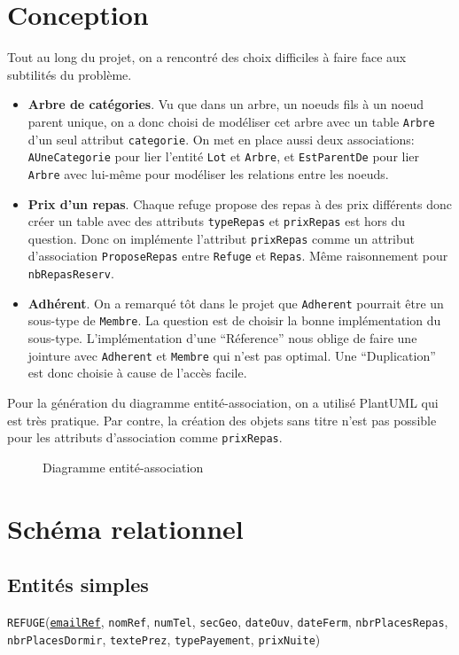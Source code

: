 \documentclass[12pt, a4paper]{article}
\newcommand\att[1]{\textnhtt{#1}}
\begin{document}
\section{Conception}
Tout au long du projet, on a rencontré des choix difficiles à faire face aux subtilités du problème.

\begin{itemize}
\item \textbf{Arbre de catégories}.
  Vu que dans un arbre, un noeuds fils à un noeud parent unique, on a donc choisi de modéliser cet arbre avec un table \att{Arbre} d'un seul attribut \att{categorie}.
  On met en place aussi deux associations: \att{AUneCategorie} pour lier l'entité \att{Lot} et \att{Arbre}, et \att{EstParentDe} pour lier \att{Arbre} avec lui-même pour modéliser les relations entre les noeuds.
\item \textbf{Prix d'un repas}.
  Chaque refuge propose des repas à des prix différents donc créer un table avec des attributs \att{typeRepas} et \att{prixRepas} est hors du question.
  Donc on implémente l'attribut \att{prixRepas} comme un attribut d'association \att{ProposeRepas} entre \att{Refuge} et \att{Repas}.
  Même raisonnement pour \att{nbRepasReserv}.
\item \textbf{Adhérent}.
  On a remarqué tôt dans le projet que \att{Adherent} pourrait être un sous-type de \att{Membre}.
  La question est de choisir la bonne implémentation du sous-type.
  L'implémentation d'une \enquote{Réference} nous oblige de faire une jointure avec \att{Adherent} et \att{Membre} qui n'est pas optimal.
  Une \enquote{Duplication} est donc choisie à cause de l'accès facile.
\end{itemize}

Pour la génération du diagramme entité-association, on a utilisé PlantUML qui est très pratique.
Par contre, la création des objets sans titre n'est pas possible pour les attributs d'association comme \att{prixRepas}.

\begin{figure}[h!]

\caption{Diagramme entité-association}
\end{figure}

\section{Schéma relationnel}
\subsection*{Entités simples}
\att{REFUGE}(\att{\underline{emailRef}}, \att{nomRef}, \att{numTel}, \att{secGeo}, \att{dateOuv}, \att{dateFerm}, \att{nbrPlacesRepas}, \att{nbrPlacesDormir}, \att{textePrez}, \att{typePayement}, \att{prixNuite})
\end{document}
